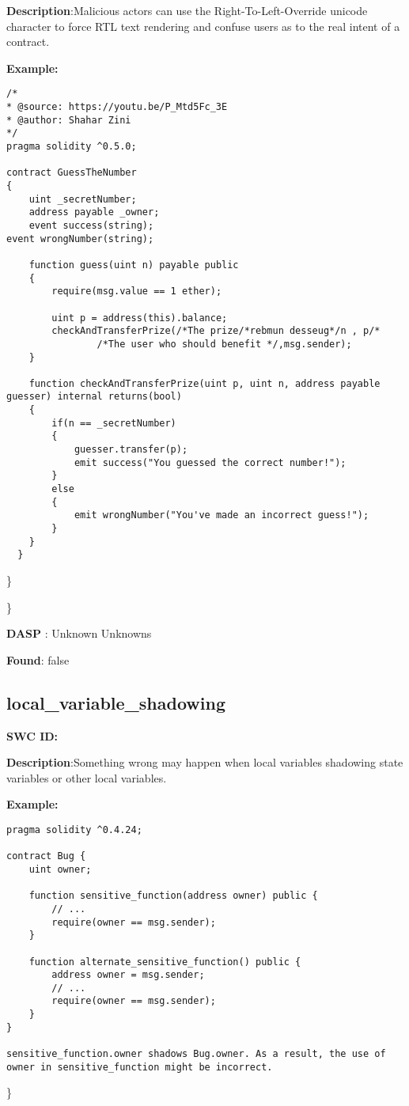 \documentclass{article}
\begin{document}
\textbf{Description}:Malicious actors can use the Right-To-Left-Override unicode character to force RTL text rendering and confuse users as to the real intent of a contract.


\textbf{Example:} 
\begin{verbatim}
/*
* @source: https://youtu.be/P_Mtd5Fc_3E
* @author: Shahar Zini
*/
pragma solidity ^0.5.0;

contract GuessTheNumber
{
    uint _secretNumber;
    address payable _owner;
    event success(string);
event wrongNumber(string);

    function guess(uint n) payable public
    {
        require(msg.value == 1 ether);

        uint p = address(this).balance;
        checkAndTransferPrize(/*The prize/*rebmun desseug*/n , p/*
                /*The user who should benefit */,msg.sender);
    }

    function checkAndTransferPrize(uint p, uint n, address payable guesser) internal returns(bool)
    {
        if(n == _secretNumber)
        {
            guesser.transfer(p);
            emit success("You guessed the correct number!");
        }
        else
        {
            emit wrongNumber("You've made an incorrect guess!");
        }
    }
  }

\end{verbatim}\} 

\} 

\textbf{DASP} : Unknown Unknowns

\textbf{Found}: false

\subsection{local\_variable\_shadowing} 
\textbf{SWC \textunderscore ID:} 

\textbf{Description}:Something wrong may happen when local variables shadowing state variables or other local variables.


\textbf{Example:} 
\begin{verbatim}
pragma solidity ^0.4.24;

contract Bug {
    uint owner;

    function sensitive_function(address owner) public {
        // ...
        require(owner == msg.sender);
    }

    function alternate_sensitive_function() public {
        address owner = msg.sender;
        // ...
        require(owner == msg.sender);
    }
}

sensitive_function.owner shadows Bug.owner. As a result, the use of owner in sensitive_function might be incorrect.

\end{verbatim}\} 
\end{document}
